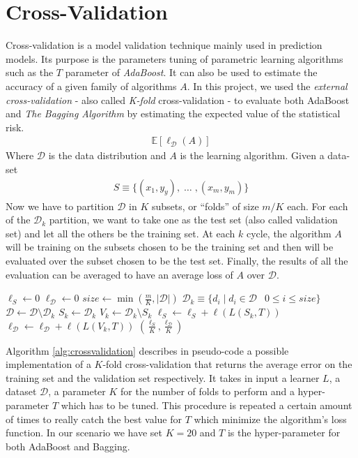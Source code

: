 \chapter{Cross-Validation}
Cross-validation is a model validation technique mainly used in prediction models. Its purpose is the parameters tuning of parametric learning algorithms such as the $T$ parameter of \textit{AdaBoost}. It can also be used to estimate the accuracy of a given family of algorithms $A$. In this project, we used the \textit{external cross-validation} - also called \textit{K-fold} cross-validation - to evaluate both AdaBoost and \textit{The Bagging Algorithm} by estimating the expected value of the statistical risk.
\begin{align*}
	\mathbb{E}[\ell_{\mathcal{D}}(A)]
\end{align*}
Where $\mathcal{D}$ is the data distribution and $A$ is the learning algorithm. Given a data-set
\begin{align*}
	S \equiv \lbrace (x_{1},y_{y}),\;\dots\;,(x_{m},y_{m}) \rbrace
\end{align*}
Now we have to partition $\mathcal{D}$ in $K$ subsets, or ``folds'' of size $m/K$ each. For each of the $\mathcal{D}_{k}$ partition, we want to take one as the test set (also called validation set) and let all the others be the training set. At each $k$ cycle, the algorithm $A$ will be training on the subsets chosen to be the training set and then will be evaluated over the subset chosen to be the test set. Finally, the results of all the evaluation can be averaged to have an average loss of $A$ over $\mathcal{D}$.

\begin{algorithm}[]
	\caption{}
	\label{alg:crossvalidation}
	\begin{algorithmic}[1]
		\State $\ell_{S} \gets 0$
		\State $\ell_{\mathcal{D}} \gets 0$
			\State $size \gets \min(\frac{m}{K}, |\mathcal{D}|)$
			\State $\mathcal{D}_{k} \equiv \lbrace d_{i} \;|\; d_{i} \in \mathcal{D} \:\;\;0 \leq i \leq size\rbrace$
			\State $\mathcal{D} \gets \mathcal{D}\setminus\mathcal{D}_{k}$
		\EndFor
			\State $S_{k} \gets \mathcal{D}_{k}$
			\State $V_{k} \gets \mathcal{D}_{k}\setminus S_{k}$
			\State $\ell_{S} \gets \ell_{S} + \ell(L(S_{k}, T))$
			\State $\ell_{\mathcal{D}} \gets \ell_{\mathcal{D}} + \ell(L(V_{k}, T)) $
		\EndFor
		\Return $(\frac{\ell_{S}}{K},\frac{\ell_{\mathcal{D}}}{K})$
		\EndProcedure
	\end{algorithmic}
\end{algorithm}

Algorithm \ref{alg:crossvalidation} describes in pseudo-code a possible implementation of a $K$-fold cross-validation that returns the average error on the training set and the validation set respectively. It takes in input a learner $L$, a dataset $\mathcal{D}$, a parameter $K$ for the number of folds to perform and a hyper-parameter $T$ which has to be tuned. This procedure is repeated a certain amount of times to really catch the best value for $T$ which minimize the algorithm's loss function. In our scenario we have set $K=20$ and $T$ is the hyper-parameter for both AdaBoost and Bagging.
